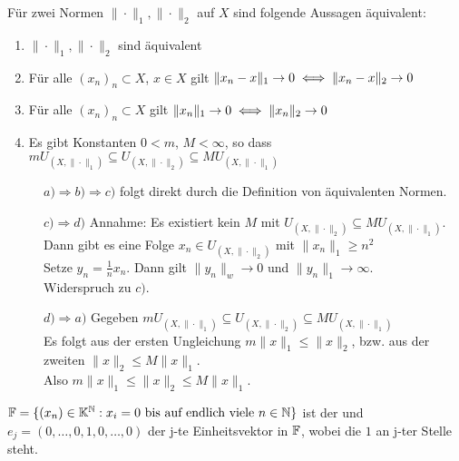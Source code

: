 \newpage %

\begin{prop} \label{prop:2.7}
	Für zwei Normen $\| \cdot \|_{1}, \| \cdot \|_{2}$ auf $X$ sind folgende Aussagen äquivalent:
	\begin{enumerate}[label=\alph*\upshape)]
		\item $\| \cdot \|_{1}, \| \cdot \|_{2}$ sind äquivalent
		\item Für alle $(x_{n})_{n} \subset X$, $x \in X$ gilt $\| x_{n} - x \|_{1} \rightarrow 0 \iff \| x_{n} - x \|_{2} \rightarrow 0 $
		\item Für alle $(x_{n})_{n} \subset X$ gilt $\| x_{n} \|_{1} \rightarrow 0 \iff \| x_{n} \|_{2} \rightarrow 0 $
		\item Es gibt Konstanten $0 < m$, $M < \infty$, so dass $m U_{(X, \| \cdot \|_{1})} \subseteq U_{(X, \| \cdot \|_{2})} \subseteq M U_{(X, \| \cdot \|_{1})}$
	\end{enumerate}
	\begin{beweis}
		\begin{description}
			\item[] $a) \Rightarrow b) \Rightarrow c)$ folgt direkt durch die Definition von äquivalenten Normen. 
  			\item[] $c) \Rightarrow d)$ Annahme: Es existiert kein $M$ mit $U_{(X, \| \cdot \|_{2})} \subseteq M U_{(X, \| \cdot \|_{1})}$. \\
  				Dann gibt es eine Folge $x_{n} \in U_{(X, \| \cdot \|_{2})}$ mit $\| x_{n} \|_{1} \geq n^{2}$ \\
  				Setze $y_{n} =  \frac{1}{n} x_{n}$. Dann gilt $\| y_{n} \|_{w} \rightarrow 0$ und $\| y_{n} \|_{1} \rightarrow \infty$. \\
  				Widerspruch zu $c)$.
  			 \item[] $d) \Rightarrow a)$ Gegeben $m U_{(X, \| \cdot \|_{1})} \subseteq U_{(X, \| \cdot \|_{2})} \subseteq M U_{(X, \| \cdot \|_{1})}$ \\
  			 Es folgt aus der ersten Ungleichung  $m \| x \|_{1} \leq \| x \|_{2}$, bzw. aus der zweiten $\| x \|_{2} \leq M \| x \|_{1}$. \\
  			 Also $m \| x \|_{1} \leq \| x \|_{2} \leq M \| x \|_{1}$. 
		\end{description}
	\end{beweis}
\end{prop}


\begin{vereinbarung}
	$\mathbb{F} = \{ (x_{n}) \in \mathbb{K}^{\mathbb{N}}: x_{i} = 0 \text{ bis auf endlich viele } n \in \mathbb{N} \} $ ist der  und $e_{j} = (0, \dotsc, 0, 1, 0, \dotsc, 0) $ der j-te Einheitsvektor in $\mathbb{F}$, wobei die $1$ an j-ter Stelle steht.
\end{vereinbarung}


